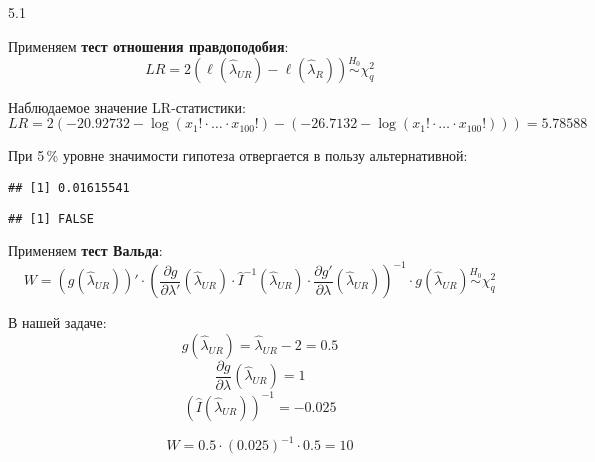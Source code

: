 \begin{solution}{{5.1}}
\begin{enumerate}
Применяем \textbf{тест отношения правдоподобия}:
\[LR = 2\left(\ell(\hat{\lambda}_{UR}) - \ell(\hat{\lambda}_R)\right) \overset{H_0}{\sim} \chi^2_q\]

Наблюдаемое значение LR-статистики:
\[ LR =2\left(-20.92732 - \log \left(x_1!\cdot \ldots \cdot x_{100}!\right) - \left(-26.7132 - \log \left(x_1!\cdot \ldots \cdot x_{100}! \right) \right)\right) = 5.78588\]

При 5\,\% уровне значимости гипотеза отвергается в пользу альтернативной:
\begin{knitrout}
\color{fgcolor}\begin{kframe}
\begin{alltt}
 \hlkwb{<-}  \hlopt{-} \hlstd{(}\hlstd{,}  \hlstd{=} \hlstd{)}
\end{alltt}
\begin{verbatim}
## [1] 0.01615541
\end{verbatim}
\begin{alltt}
 \hlopt{>}  
\end{alltt}
\begin{verbatim}
## [1] FALSE
\end{verbatim}
\end{kframe}
\end{knitrout}

Применяем \textbf{тест Вальда}:
\[W = \left(g\left(\hat{\lambda}_{UR} \right) \right)' \cdot \left( \dfrac{\partial g}{\partial \lambda'}\left(\hat{\lambda}_{UR} \right) \cdot \widehat{I}^{-1} \left(\hat{\lambda}_{UR} \right) \cdot \dfrac{\partial g'}{\partial \lambda}\left(\hat{\lambda}_{UR} \right) \right)^{-1} \cdot g\left(\hat{\lambda}_{UR} \right) \overset{H_0}{\sim} \chi^2_q \]

В нашей задаче:
\[g\left(\hat{\lambda}_{UR} \right) = \hat{\lambda}_{UR} - 2 = 0.5\]
\[ \dfrac{\partial g}{\partial \lambda}\left(\hat{\lambda}_{UR} \right) = 1\]
\[\left(\hat{I} \left(\hat{\lambda}_{UR} \right) \right)^{-1} = -0.025 \]

\[W = 0.5 \cdot \left(0.025 \right)^{-1} \cdot 0.5 = 10 \]


\end{enumerate}
\end{solution}
